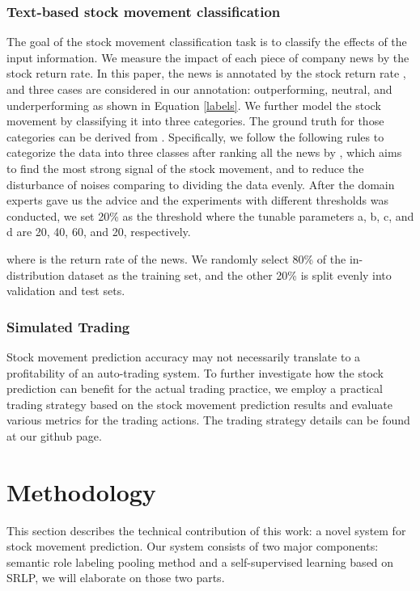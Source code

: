 \documentclass{article}
\begin{document}
\subsubsection{Text-based stock movement classification} 


The goal of the stock movement classification task is to classify the effects of the input information. We measure the impact of each piece of company news by the stock return rate. 
 In this paper, the news is annotated by the stock return rate  , and three cases are considered in our annotation: outperforming, neutral, and underperforming as shown in Equation \ref{labels}. We further model the stock movement by classifying it into three categories. The ground truth for those categories can be derived from . Specifically, we follow the following rules to categorize the data into three classes after ranking all the news by , which aims to find the most strong signal of the stock movement, and to reduce the disturbance of noises comparing to dividing the data evenly. After the domain experts gave us the advice and the experiments with different thresholds was conducted, we set 20\% as the threshold where the tunable parameters a, b, c, and d are 20, 40, 60, and 20, respectively.
 

where  is the return rate of the news. We randomly select 80\% of the in-distribution dataset as the training set, and the other 20\% is split evenly into validation and test sets. 






\subsubsection{Simulated Trading}
Stock movement prediction accuracy may not necessarily translate to a profitability of an auto-trading system. To further investigate how the stock prediction can benefit for the actual trading practice, we employ a practical trading strategy based on the stock movement prediction results and evaluate various metrics for the trading actions. The trading strategy details can be found at our github page.





\section{Methodology}
This section describes the technical contribution of this work: a novel system for stock movement prediction. Our system consists of two major components: semantic role labeling pooling method and a self-supervised learning based on SRLP, we will elaborate on those two parts. 
\end{document}
